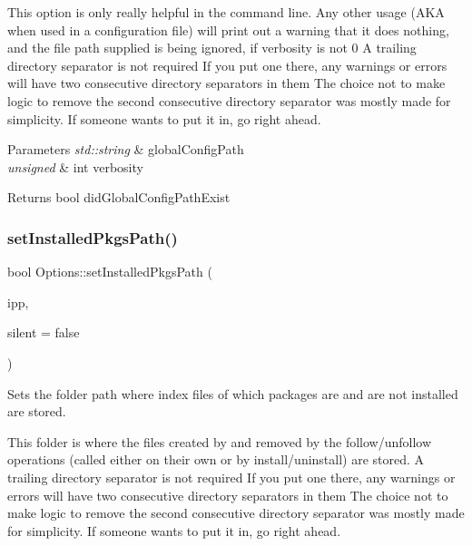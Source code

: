 This option is only really helpful in the command line. Any other usage (A\+KA when used in a configuration file) will print out a warning that it does nothing, and the file path supplied is being ignored, if verbosity is not 0 A trailing directory separator is not required If you put one there, any warnings or errors will have two consecutive directory separators in them The choice not to make logic to remove the second consecutive directory separator was mostly made for simplicity. If someone wants to put it in, go right ahead.


\begin{DoxyParams}{Parameters}
{\em std\+::string} & global\+Config\+Path \\
\hline
{\em unsigned} & int verbosity\\
\hline
\end{DoxyParams}
\begin{DoxyReturn}{Returns}
bool did\+Global\+Config\+Path\+Exist 
\end{DoxyReturn}
\mbox{\label{classOptions_ad4db404ce1e4e6f07e863423ab1d5c75}} 
\subsubsection{\texorpdfstring{setInstalledPkgsPath()}{setInstalledPkgsPath()}\hspace{0.1cm}{\footnotesize\ttfamily [1/2]}}
{\footnotesize\ttfamily bool Options\+::set\+Installed\+Pkgs\+Path (\begin{DoxyParamCaption}\item[{std\+::string}]{ipp,  }\item[{bool}]{silent = {\ttfamily false} }\end{DoxyParamCaption})}



Sets the folder path where index files of which packages are and are not installed are stored. 

This folder is where the files created by and removed by the follow/unfollow operations (called either on their own or by install/uninstall) are stored. A trailing directory separator is not required If you put one there, any warnings or errors will have two consecutive directory separators in them The choice not to make logic to remove the second consecutive directory separator was mostly made for simplicity. If someone wants to put it in, go right ahead.

